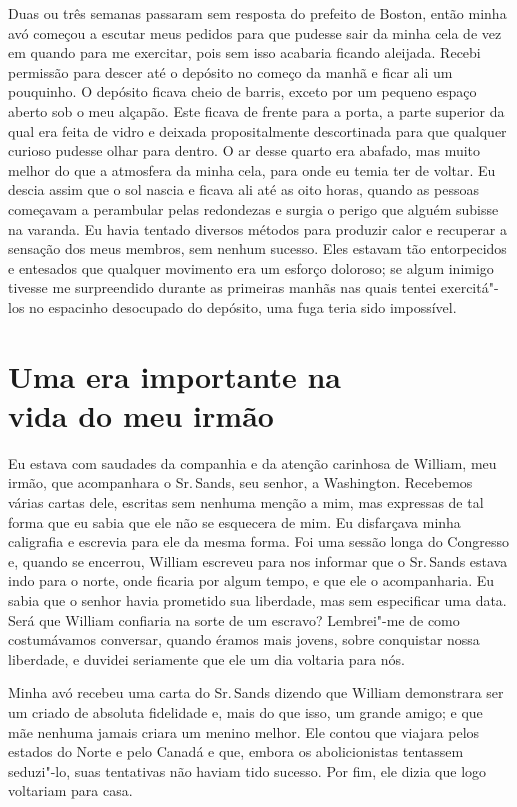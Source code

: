 Duas ou três semanas passaram sem
resposta do prefeito de Boston, então minha avó começou a escutar meus
pedidos para que pudesse sair da minha cela de vez em quando para me
exercitar, pois sem isso acabaria ficando aleijada. Recebi permissão
para descer até o depósito no começo da manhã e ficar ali um pouquinho.
O depósito ficava cheio de barris, exceto por um pequeno espaço aberto
sob o meu alçapão. Este ficava de frente para a porta, a parte superior
da qual era feita de vidro e deixada propositalmente descortinada para
que qualquer curioso pudesse olhar para dentro. O ar desse quarto era
abafado, mas muito melhor do que a atmosfera da minha cela, para onde eu
temia ter de voltar. Eu descia assim que o sol nascia e ficava ali até
as oito horas, quando as pessoas começavam a perambular pelas redondezas
e surgia o perigo que alguém subisse na varanda. Eu havia tentado
diversos métodos para produzir calor e recuperar a sensação dos meus
membros, sem nenhum sucesso. Eles estavam tão entorpecidos e entesados
que qualquer movimento era um esforço doloroso; se algum inimigo tivesse
me surpreendido durante as primeiras manhãs nas quais tentei
exercitá"-los no espacinho desocupado do depósito, uma fuga teria sido
impossível.

\chapter*{Uma era importante na\\ vida do meu irmão}

Eu estava com saudades da companhia e
da atenção carinhosa de William, meu irmão, que acompanhara o Sr.\,Sands,
seu senhor, a Washington. Recebemos várias cartas dele, escritas sem
nenhuma menção a mim, mas expressas de tal forma que eu sabia que ele
não se esquecera de mim. Eu disfarçava minha caligrafia e escrevia para
ele da mesma forma. Foi uma sessão longa do Congresso e, quando se
encerrou, William escreveu para nos informar que o Sr.\,Sands estava indo
para o norte, onde ficaria por algum tempo, e que ele o acompanharia. Eu
sabia que o senhor havia prometido sua liberdade, mas sem especificar
uma data. Será que William confiaria na sorte de um escravo? Lembrei"-me
de como costumávamos conversar, quando éramos mais jovens, sobre
conquistar nossa liberdade, e duvidei seriamente que ele um dia voltaria
para nós.

Minha avó recebeu uma carta do Sr.\,Sands dizendo que William demonstrara ser um criado de absoluta
fidelidade e, mais do que isso, um grande amigo; e que mãe nenhuma
jamais criara um menino melhor. Ele contou que viajara pelos estados do
Norte e pelo Canadá e que, embora os abolicionistas tentassem seduzi"-lo,
suas tentativas não haviam tido sucesso. Por fim, ele dizia que logo
voltariam para casa.

